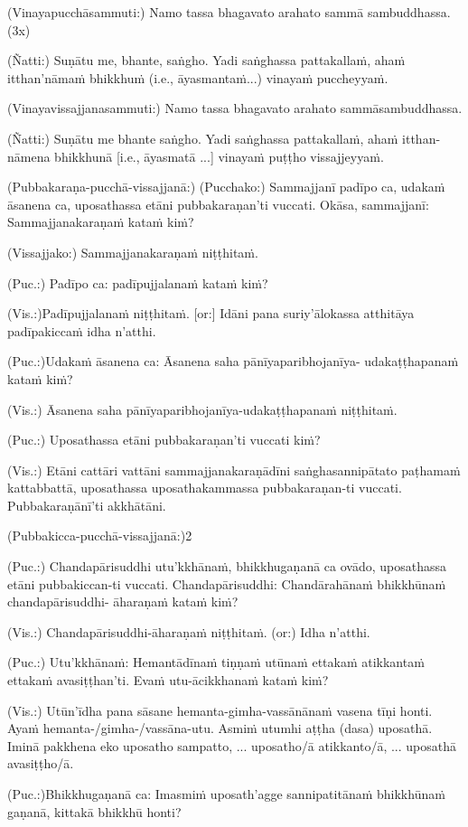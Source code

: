 
(Vinayapucchāsammuti:) Namo tassa bhagavato arahato sammā sambuddhassa. (3x)

(Ñatti:) Suṇātu me, bhante, saṅgho. Yadi saṅghassa pattakallaṁ, ahaṁ itthan'nāmaṁ bhikkhuṁ (i.e., āyasmantaṁ...) vinayaṁ puccheyyaṁ.

(Vinayavissajjanasammuti:) Namo tassa bhagavato arahato sammāsambuddhassa.

(Ñatti:) Suṇātu me bhante saṅgho. Yadi saṅghassa pattakallaṁ, ahaṁ itthan-nāmena bhikkhunā [i.e., āyasmatā ...] vinayaṁ puṭṭho vissajjeyyaṁ.

(Pubbakaraṇa-pucchā-vissajjanā:) (Pucchako:) Sammajjanī padīpo ca, udakaṁ āsanena ca,  uposathassa etāni pubbakaraṇan'ti vuccati. Okāsa, sammajjanī: Sammajjanakaraṇaṁ kataṁ kiṁ?

(Vissajjako:) Sammajjanakaraṇaṁ niṭṭhitaṁ.

(Puc.:) Padīpo ca: padīpujjalanaṁ kataṁ kiṁ?

(Vis.:)Padīpujjalanaṁ niṭṭhitaṁ. [or:] Idāni pana suriy'ālokassa atthitāya
padīpakiccaṁ idha n'atthi.

(Puc.:)Udakaṁ āsanena ca: Āsanena saha pānīyaparibhojanīya-
udakaṭṭhapanaṁ kataṁ kiṁ?

(Vis.:) Āsanena saha pānīyaparibhojanīya-udakaṭṭhapanaṁ niṭṭhitaṁ.

(Puc.:) Uposathassa etāni pubbakaraṇan'ti vuccati kiṁ?

(Vis.:) Etāni cattāri vattāni sammajjanakaraṇādīni saṅghasannipātato
paṭhamaṁ kattabbattā, uposathassa uposathakammassa pubbakaraṇan-ti
vuccati. Pubbakaraṇānī'ti akkhātāni.

(Pubbakicca-pucchā-vissajjanā:)2

(Puc.:) Chandapārisuddhi utu'kkhānaṁ, bhikkhugaṇanā ca ovādo,
uposathassa etāni pubbakiccan-ti vuccati.
Chandapārisuddhi: Chandārahānaṁ bhikkhūnaṁ chandapārisuddhi-
āharaṇaṁ kataṁ kiṁ?

(Vis.:) Chandapārisuddhi-āharaṇaṁ niṭṭhitaṁ. (or:) Idha n'atthi.

(Puc.:) Utu'kkhānaṁ: Hemantādīnaṁ tiṇṇaṁ utūnaṁ ettakaṁ
atikkantaṁ ettakaṁ avasiṭṭhan'ti. Evaṁ utu-ācikkhanaṁ kataṁ kiṁ?

(Vis.:) Utūn'īdha pana sāsane hemanta-gimha-vassānānaṁ vasena tīṇi
honti. Ayaṁ hemanta-/gimha-/vassāna-utu. Asmiṁ utumhi aṭṭha (dasa)
uposathā. Iminā pakkhena eko uposatho sampatto, ... uposatho/ā
atikkanto/ā, ... uposathā avasiṭṭho/ā.

(Puc.:)Bhikkhugaṇanā ca: Imasmiṁ uposath'agge sannipatitānaṁ
bhikkhūnaṁ gaṇanā, kittakā bhikkhū honti?

